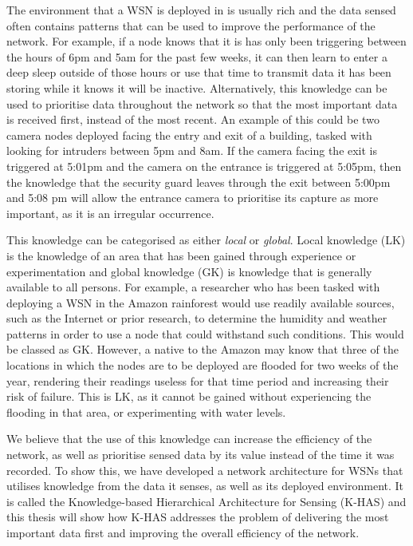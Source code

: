 The environment that a WSN is deployed in is usually rich and the data sensed often contains patterns that can be used to improve the performance of the network. For example, if a node knows that it is has only been triggering between the hours of 6pm and 5am for the past few weeks, it can then learn to enter a deep sleep outside of those hours or use that time to transmit data it has been storing while it knows it will be inactive. Alternatively, this knowledge can be used to prioritise data throughout the network so that the most important data is received first, instead of the most recent. An example of this could be two camera nodes deployed facing the entry and exit of a building, tasked with looking for intruders between 5pm and 8am. If the camera facing the exit is triggered at 5:01pm and the camera on the entrance is triggered at 5:05pm, then the knowledge that the security guard leaves through the exit between 5:00pm and 5:08 pm will allow the entrance camera to prioritise its capture as more important, as it is an irregular occurrence.

This knowledge can be categorised as either \textit{local} or \textit{global}. Local knowledge (LK)  is the knowledge of an area that has been gained through experience or experimentation \cite{Joshi2001} and global knowledge (GK) is knowledge that is generally available to all persons. For example, a researcher who has been tasked with deploying a WSN in the Amazon rainforest would use readily available sources, such as the Internet or prior research, to determine the humidity and weather patterns in order to use a node that could withstand such conditions. This would be classed as GK. However, a native to the Amazon may know that three of the locations in which the nodes are to be deployed are flooded for two weeks of the year, rendering their readings useless for that time period and increasing their risk of failure. This is LK, as it cannot be gained without experiencing the flooding in that area, or experimenting with water levels.

We believe that the use of this knowledge can increase the efficiency of the network, as well as prioritise sensed data by its value instead of the time it was recorded. To show this, we have developed a network architecture for WSNs that utilises knowledge from the data it senses, as well as its deployed environment. It is called the Knowledge-based Hierarchical Architecture for Sensing (K-HAS)  and this thesis will show how K-HAS addresses the problem of delivering the most important data first and improving the overall efficiency of the network.

